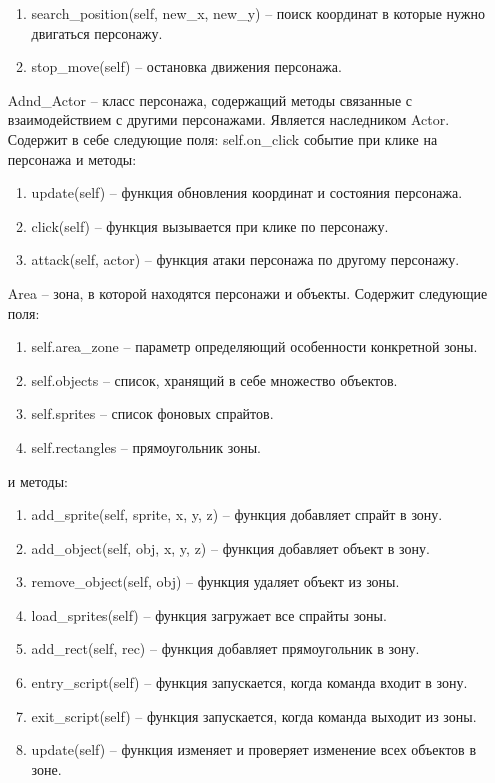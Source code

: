\begin{enumerate}
\begin{enumerate}
		\item search\_position(self, new\_x, new\_y) -- поиск координат в которые нужно двигаться персонажу.
		\item stop\_move(self) -- остановка движения персонажа.
	\end{enumerate}
	\item[Adnd\_Actor] -- класс персонажа, содержащий методы связанные с взаимодействием с другими персонажами. Является наследником Actor. Содержит в себе следующие поля:
		self.on\_click событие при клике на персонажа
	и методы:
	\begin{enumerate}
		\item update(self) -- функция обновления координат и состояния персонажа.
		\item click(self) -- функция вызывается при клике по персонажу.
		\item attack(self, actor) --  функция атаки персонажа по другому персонажу.
	\end{enumerate}
	\item[Area] -- зона, в которой находятся персонажи и объекты. Содержит следующие поля:
	\begin{enumerate}
		\item self.area\_zone -- параметр определяющий особенности конкретной зоны.
		\item self.objects -- список, хранящий в себе множество объектов.
		\item self.sprites -- список фоновых спрайтов.
		\item self.rectangles -- прямоугольник зоны.
	\end{enumerate}
	и методы:
	\begin{enumerate}
		\item add\_sprite(self, sprite, x, y, z) -- функция добавляет спрайт в зону.
		\item add\_object(self, obj, x, y, z) -- функция добавляет объект в зону.
		\item remove\_object(self, obj) -- функция удаляет объект из зоны.
		\item load\_sprites(self) -- функция загружает все спрайты зоны.
		\item add\_rect(self, rec) -- функция добавляет прямоугольник в зону.
		\item entry\_script(self) -- функция запускается, когда команда входит в зону.
		\item exit\_script(self) -- функция запускается, когда команда выходит из зоны.
		\item update(self) -- функция изменяет и проверяет изменение всех объектов в зоне.

\end{enumerate}
\end{enumerate}
